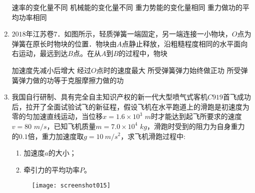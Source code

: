 \begin{enumerate}[leftmargin=0em]
\fourchoices
{速率的变化量不同}
{机械能的变化量不同}
{重力势能的变化量相同}
{重力做功的平均功率相同}




\item 
$ 2018 $年江苏卷$ 7 $．如图所示，轻质弹簧一端固定，另一端连接一小物块，$ O $点为弹簧在原长时物块的位置．物块由$ A $点静止释放，沿粗糙程度相同的水平面向右运动，最远到达$ B $点。在从$ A $到$ B $的过程中，物块  
\begin{figure}[h!]
\centering

\end{figure}

\fourchoices
{加速度先减小后增大}
{经过$ O $点时的速度最大}
{所受弹簧弹力始终做正功}
{所受弹簧弹力做的功等于克服摩擦力做的功}


\item
{}
我国自行研制、具有完全自主知识产权的新一代大型喷气式客机$ C919 $首飞成功后，拉开了全面试验试飞的新征程，假设飞机在水平跑道上的滑跑是初速度为零的匀加速直线运动，当位移$ x=1.6 \times 10^3 $ $ m $时才能达到起飞所要求的速度$ v=80 $ $ m/s $，已知飞机质量$ m=7.0 \times 10^4 $ $ kg $，滑跑时受到的阻力为自身重力的$ 0.1 $倍，重力加速度取$ g=10\ m/s^{2} $，求飞机滑跑过程中:

\begin{enumerate}
\renewcommand{\labelenumi}{\arabic{enumi}.}
\item
加速度$ a $的大小；
\item 
牵引力的平均功率$ P $。



\end{enumerate}
\begin{figure}[h!]
\flushright 
\texttt{[image: screenshot015]}
\end{figure}

\end{enumerate}
